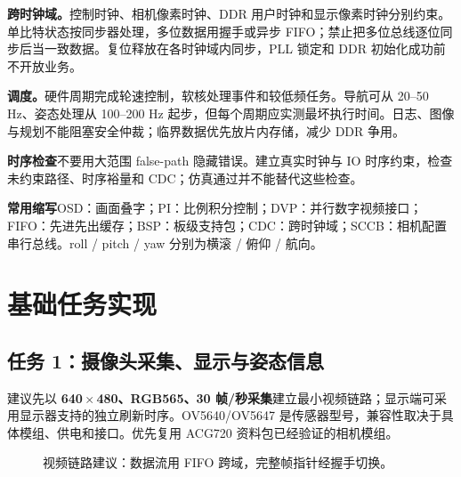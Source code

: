 \documentclass[UTF8,a4paper,zihao=-4,fontset=fandol]{ctexart}
\newcommand{\note}[2]{\par\smallskip\noindent\colorbox{Pale}{\parbox{\dimexpr\linewidth-2\fboxsep\relax}{\small\textbf{\color{Teal}#1}\quad #2}}\par\smallskip}
\newcommand{\warn}[2]{\par\smallskip\noindent\colorbox{Warm}{\parbox{\dimexpr\linewidth-2\fboxsep\relax}{\small\textbf{\color{Amber}#1}\quad #2}}\par\smallskip}
\newcommand{\nextpage}{\clearpage}
\begin{document}
\textbf{跨时钟域。}控制时钟、相机像素时钟、DDR 用户时钟和显示像素时钟分别约束。单比特状态按同步器处理，多位数据用握手或异步 FIFO；禁止把多位总线逐位同步后当一致数据。复位释放在各时钟域内同步，PLL 锁定和 DDR 初始化成功前不开放业务。

\textbf{调度。}硬件周期完成轮速控制，软核处理事件和较低频任务。导航可从 20--50 Hz、姿态处理从 100--200 Hz 起步，但每个周期应实测最坏执行时间。日志、图像与规划不能阻塞安全仲裁；临界数据优先放片内存储，减少 DDR 争用。

\warn{时序检查}{不要用大范围 false-path 隐藏错误。建立真实时钟与 IO 时序约束，检查未约束路径、时序裕量和 CDC；仿真通过并不能替代这些检查。}

\note{常用缩写}{OSD：画面叠字；PI：比例积分控制；DVP：并行数字视频接口；FIFO：先进先出缓存；BSP：板级支持包；CDC：跨时钟域；SCCB：相机配置串行总线。roll / pitch / yaw 分别为横滚 / 俯仰 / 航向。}

\nextpage
\section{基础任务实现}\label{sec:base}
\subsection{任务 1：摄像头采集、显示与姿态信息}

建议先以 \textbf{640\,$\times$\,480、RGB565、30 帧/秒采集}建立最小视频链路；显示端可采用显示器支持的独立刷新时序。OV5640/OV5647 是传感器型号，兼容性取决于具体模组、供电和接口。优先复用 ACG720 资料包已经验证的相机模组。

\begin{figure}[H]\centering
{}
\caption{视频链路建议：数据流用 FIFO 跨域，完整帧指针经握手切换。}\label{fig:video}
\end{figure}
\end{document}
